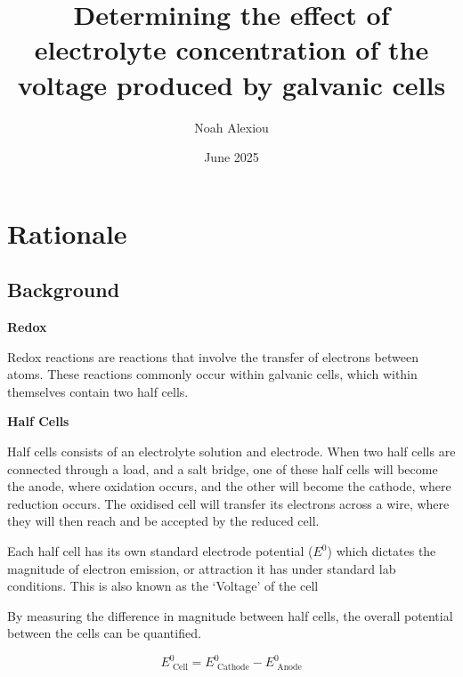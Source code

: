 \documentclass[10.5pt,a4paper]{article}
\begin{document}
	\nocite{*}
	
	\begin{titlepage}
		
		
		\title{Determining the effect of electrolyte concentration of the voltage produced by galvanic cells}
		
		\author{Noah Alexiou}
		
		
		\date{June 2025}
		
		\maketitle
		\centering
		
	\end{titlepage}
	\tableofcontents
	\newpage
	
	
	\section{Rationale}
	
	
	\subsection{Background}

	

	\textbf{Redox}
	
	Redox reactions are reactions that involve the transfer of electrons between atoms. These reactions commonly occur within galvanic cells, which within themselves contain two half cells. 
	

	\textbf{Half Cells}
	
	Half cells consists of an electrolyte solution and electrode. When two half cells are connected through a load, and a salt  bridge, one of these half cells will become the anode, where oxidation occurs, and the other will become the cathode, where reduction occurs. The oxidised cell will transfer its electrons across a wire, where they will then reach and be accepted by the reduced cell.
	
	Each half cell has its own standard electrode potential ($E^0$) which dictates the magnitude of electron emission, or attraction it has under standard lab conditions. This is also known as the `Voltage' of the cell
	
	By measuring the difference in magnitude between half cells, the overall potential between the cells can be quantified. \cite{GalvanicCellsCite}
	
	$$
	E^0_{\textrm{ Cell}}=E^0_{\textrm{ Cathode}}-E^0_{\textrm{ Anode}}
	$$
	
\end{document}
